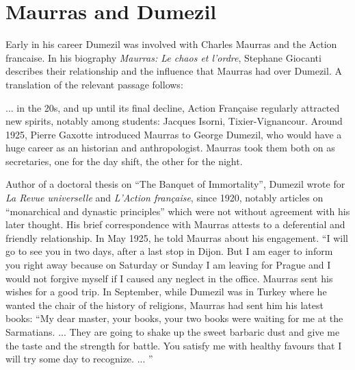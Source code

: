\section{Maurras and Dumezil}

Early in his career Dumezil was involved with Charles Maurras and the Action francaise. In his biography \textit{Maurras: Le chaos et l'ordre}, Stephane Giocanti describes their relationship and the influence that Maurras had over Dumezil. A translation of the relevant passage follows:

\begin{quotex}
... in the 20s, and up until its final decline, Action Française regularly attracted new spirits, notably among students: Jacques Isorni, Tixier-Vignancour. Around 1925, Pierre Gaxotte introduced Maurras to George Dumezil, who would have a huge career as an historian and anthropologist. Maurras took them both on as secretaries, one for the day shift, the other for the night.

Author of a doctoral thesis on ``The Banquet of Immortality'', Dumezil wrote for \emph{La Revue universelle} and \emph{L'Action française}, since 1920, notably articles on ``monarchical and dynastic principles'' which were not without agreement with his later thought. His brief correspondence with Maurras attests to a deferential and friendly relationship. In May 1925, he told Maurras about his engagement. ``I will go to see you in two days, after a last stop in Dijon. But I am eager to inform you right away because on Saturday or Sunday I am leaving for Prague and I would not forgive myself if I caused any neglect in the office. Maurras sent his wishes for a good trip. In September, while Dumezil was in Turkey where he wanted the chair of the history of religions, Maurras had sent him his latest books: ``My dear master, your books, your two books were waiting for me at the Sarmatians. ... They are going to shake up the sweet barbaric dust and give me the taste and the strength for battle. You satisfy me with healthy favours that I will try some day to recognize. ... ''


\end{quotex}
